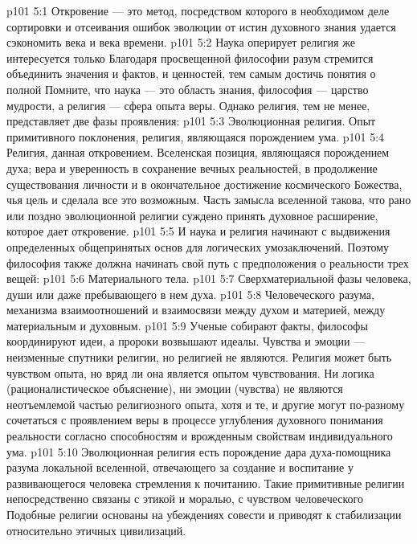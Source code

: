 \vs p101 5:1 Откровение --- это метод, посредством которого в необходимом деле сортировки и отсеивания ошибок эволюции от истин духовного знания удается сэкономить века и века времени.
\vs p101 5:2 Наука оперирует  религия же интересуется только  Благодаря просвещенной философии разум стремится объединить значения и фактов, и ценностей, тем самым достичь понятия о полной  Помните, что наука --- это область знания, философия --- царство мудрости, а религия --- сфера опыта веры. Однако религия, тем не менее, представляет две фазы проявления:
\vs p101 5:3 \bibnobreakspace Эволюционная религия. Опыт примитивного поклонения, религия, являющаяся порождением ума.
\vs p101 5:4 \bibnobreakspace Религия, данная откровением. Вселенская позиция, являющаяся порождением духа; вера и уверенность в сохранение вечных реальностей, в продолжение существования личности и в окончательное достижение космического Божества, чья цель и сделала все это возможным. Часть замысла вселенной такова, что рано или поздно эволюционной религии суждено принять духовное расширение, которое дает откровение.
\vs p101 5:5 \pc И наука и религия начинают с выдвижения определенных общепринятых основ для логических умозаключений. Поэтому философия также должна начинать свой путь с предположения о реальности трех вещей:
\vs p101 5:6 \bibnobreakspace Материального тела.
\vs p101 5:7 \bibnobreakspace Сверхматериальной фазы человека, души или даже пребывающего в нем духа.
\vs p101 5:8 \bibnobreakspace Человеческого разума, механизма взаимоотношений и взаимосвязи между духом и материей, между материальным и духовным.
\vs p101 5:9 \pc Ученые собирают факты, философы координируют идеи, а пророки возвышают идеалы. Чувства и эмоции --- неизменные спутники религии, но религией не являются. Религия может быть чувством опыта, но вряд ли она является опытом чувствования. Ни логика (рационалистическое объяснение), ни эмоции (чувства) не являются неотъемлемой частью религиозного опыта, хотя и те, и другие могут по\hyp{}разному сочетаться с проявлением веры в процессе углубления духовного понимания реальности согласно способностям и врожденным свойствам индивидуального ума.
\vs p101 5:10 Эволюционная религия есть порождение дара духа\hyp{}помощника разума локальной вселенной, отвечающего за создание и воспитание у развивающегося человека стремления к почитанию. Такие примитивные религии непосредственно связаны с этикой и моралью, с чувством человеческого  Подобные религии основаны на убеждениях совести и приводят к стабилизации относительно этичных цивилизаций.
